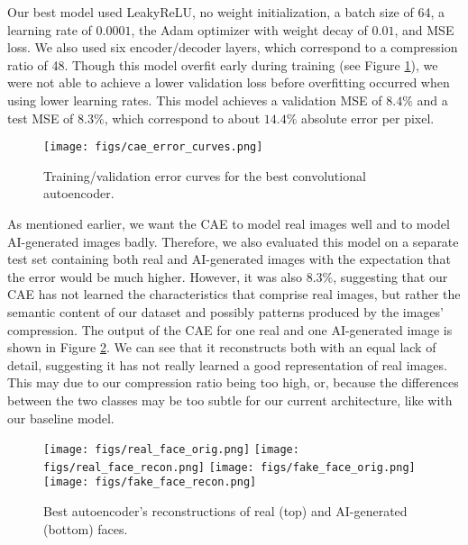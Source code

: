 \documentclass{article} %
\begin{document}
Our best model used LeakyReLU, no weight initialization, a batch size of 64, a learning rate of $0.0001$, the Adam optimizer with weight decay of $0.01$, and MSE loss. We also used six encoder/decoder layers, which correspond to a compression ratio of 48. Though this model overfit early during training (see Figure \ref{cae_curves}), we were not able to achieve a lower validation loss before overfitting occurred when using lower learning rates. This model achieves a validation MSE of $8.4\%$ and a test MSE of $8.3\%$, which correspond to about $14.4\%$ absolute error per pixel.

\begin{figure}[h]
    \label{cae_curves}
    \begin{center}
        \texttt{[image: figs/cae\_error\_curves.png]}
    \end{center}
    \caption{Training/validation error curves for the best convolutional autoencoder.}
\end{figure}

As mentioned earlier, we want the CAE to model real images well and to model AI-generated images badly. Therefore, we also evaluated this model on a separate test set containing both real and AI-generated images with the expectation that the error would be much higher. However, it was also $8.3\%$, suggesting that our CAE has not learned the characteristics that comprise real images, but rather the semantic content of our dataset and possibly patterns produced by the images' compression. The output of the CAE for one real and one AI-generated image is shown in Figure \ref{reconstructions}. We can see that it reconstructs both with an equal lack of detail, suggesting it has not really learned a good representation of real images. This may due to our compression ratio being too high, or, because the differences between the two classes may be too subtle for our current architecture, like with our baseline model.

\begin{figure}[h]
    \label{reconstructions}
    \begin{center}
        \texttt{[image: figs/real\_face\_orig.png]}
        \texttt{[image: figs/real\_face\_recon.png]}
        \texttt{[image: figs/fake\_face\_orig.png]}
        \texttt{[image: figs/fake\_face\_recon.png]}
    \end{center}
    \caption{Best autoencoder's reconstructions of real (top) and AI-generated (bottom) faces.}
\end{figure}
\end{document}
